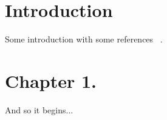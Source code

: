 \section{Introduction}
Some introduction with some references ~\cite{Englert:1964et,Higgs:1964ia,Higgs:1964pj}.
\section{Chapter 1.}
And so it begins...
